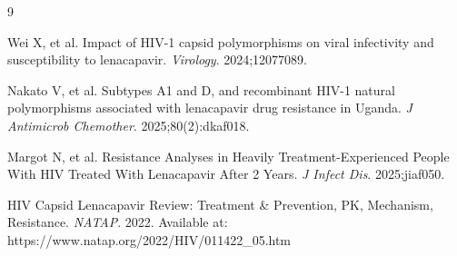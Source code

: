 \documentclass[11pt]{article}
\begin{document}
\begin{thebibliography}{9}

Wei X, et al. Impact of HIV-1 capsid polymorphisms on viral infectivity and susceptibility to lenacapavir. \textit{Virology}. 2024;12077089.

Nakato V, et al. Subtypes A1 and D, and recombinant HIV-1 natural polymorphisms associated with lenacapavir drug resistance in Uganda. \textit{J Antimicrob Chemother}. 2025;80(2):dkaf018.

Margot N, et al. Resistance Analyses in Heavily Treatment-Experienced People With HIV Treated With Lenacapavir After 2 Years. \textit{J Infect Dis}. 2025;jiaf050.

HIV Capsid Lenacapavir Review: Treatment \& Prevention, PK, Mechanism, Resistance. \textit{NATAP}. 2022. Available at: https://www.natap.org/2022/HIV/011422\_05.htm

\end{thebibliography}
\end{document}
